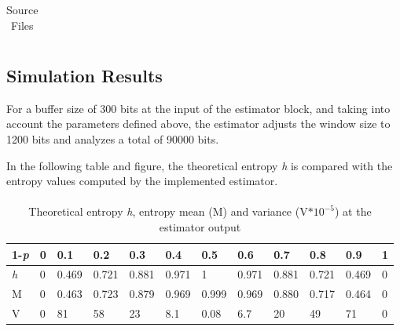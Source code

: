 \begin{refsection}
\begin{table}[H]
\begin{tabular}{|c|c|c|}
\end{tabular}
\caption{Source Files}
\label{tb:signalss}
\end{table}


\subsection{Simulation Results}
For a buffer size of 300 bits at the input of the estimator block, and taking into account the parameters 
defined above, the estimator adjusts the window size to 1200 bits 
and analyzes a total of 90000 bits.

In the following table and figure, the theoretical entropy \textit{h} is compared with the entropy values
computed by the implemented estimator.

\paragraph{}

\begin{table}[H]

\centering
\begin{tabular}{| l | l | l | l | l | l | l | l | l | l | l | l |}
    \hline
    1-\textit{p} & 0 & 0.1 & 0.2 & 0.3 & 0.4 & 0.5 & 0.6 & 0.7 & 0.8 & 0.9 & 1 \\ \hline
    \textit{h} & 0 & 0.469 & 0.721  & 0.881  & 0.971 & 1 & 0.971 & 0.881 & 0.721 & 0.469 & 0 \\ \hline 
	M & 0 & 0.463 & 0.723 & 0.879 & 0.969 & 0.999 & 0.969 & 0.880 & 0.717 & 0.464 & 0 \\ \hline    
    V & 0 & 81 & 58 & 23 & 8.1 & 0.08 & 6.7 & 20 & 49 & 71 & 0 \\ \hline
\end{tabular}
\caption{Theoretical entropy \textit{h}, entropy mean (M) and variance (V$*10^{-5}$) at the estimator output}
\end{table}


\begin{figure}[H]

\end{figure}
\end{refsection}
